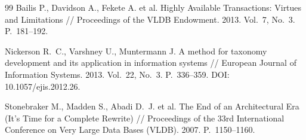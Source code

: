 \documentclass{misisarticle}
\begin{document}
\begin{thebibliography}{99}
 Bailis P., Davidson A., Fekete A. et al. Highly Available Transactions: Virtues and Limitations // Proceedings of the VLDB Endowment. 2013. Vol.~7, No.~3. P.~181--192.

 Nickerson R.~C., Varshney U., Muntermann J. A method for taxonomy development and its application in information systems // European Journal of Information Systems. 2013. Vol.~22, No.~3. P.~336--359. DOI: 10.1057/ejis.2012.26.

 Stonebraker M., Madden S., Abadi D.~J. et al. The End of an Architectural Era (It's Time for a Complete Rewrite) // Proceedings of the 33rd International Conference on Very Large Data Bases (VLDB). 2007. P.~1150--1160.

\end{thebibliography}
\end{document}
